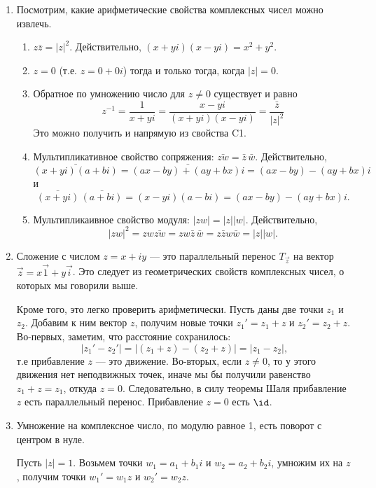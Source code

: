 \begin{enumerate}
\begin{center}
\end{center}
\item Посмотрим, какие арифметические свойства комплексных чисел можно извлечь.
\begin{enumerate}[\bf C1)]
\item $z\bar z=|z|^2$. Действительно, $(x+yi)(x-yi)=x^2+y^2$.
\item $z=0$ (т.е. $z=0+0i$) тогда и только тогда, когда $|z|=0$.
\item Обратное по умножению число для $z\ne 0$ существует и равно
$$
z^{-1} = \frac{1}{x+yi}=\frac{x-yi}{(x+yi)(x-yi)}=\frac{\bar z}{|z|^2}
$$
Это можно получить и напрямую из свойства C1.
\item Мультипликативное свойство сопряжения: $\bar{zw}=\bar{z}\,\bar{w}$. Действительно,
$$ 
\bar{(x+yi)(a+bi)} = \bar{(ax-by)+(ay+bx)i} = (ax-by)-(ay+bx)i
$$
и
$$
\bar{(x+yi)}\,\bar{(a+bi)} = (x-yi)(a-bi) = (ax-by)-(ay+bx)i.
$$
\item Мультипликаивное свойство модуля: $|zw|=|z||w|$. Действительно,
$$
|zw|^2 = zw\bar{zw} = zw\bar{z}\,\bar{w} = z\bar{z}w\bar{w} = |z||w|.
$$
\end{enumerate}




\item Сложение с числом $z=x+iy$ --- это параллельный перенос $T_{\vec z}$ на вектор $\vec z=x\vec 1+y\vec i$. Это следует из геометрических свойств комплексных чисел, о которых мы говорили выше.

Кроме того, это легко проверить арифметически. Пусть даны две точки $z_1$ и $z_2$. Добавим к ним вектор $z$, получим новые точки $z_1'=z_1+z$ и $z_2'=z_2+z$. Во-первых, заметим, что расстояние сохранилось:
$$
|z_1'-z_2'| = |(z_1+z)-(z_2+z)| = |z_1-z_2|,
$$
т.е прибавление $z$ --- это движение. Во-вторых, если $z\ne 0$, то у этого движения нет неподвижных точек, иначе мы бы получили равенство $z_1+z=z_1$, откуда $z=0$. Следовательно, в силу теоремы Шаля прибавление $z$ есть параллельный перенос. Прибавление $z=0$ есть $\id$.

\item Умножение на комплексное число, по модулю равное 1, есть поворот с центром в нуле.

Пусть $|z|=1$. Возьмем точки $w_1=a_1+b_1i$ и $w_2=a_2+b_2i$,  умножим их на $z$, получим точки $w_1'=w_1z$ и $w_2'=w_2z$.


\end{enumerate}
